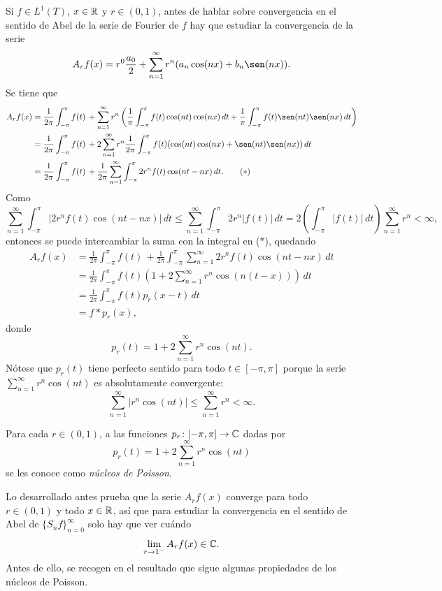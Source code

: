 \documentclass[a4paper, 11pt, oneside]{report}
\begin{document}
Si $f \in L^1(T)$, $x \in \mathbb R$ y $r \in (0,1)$, antes de hablar sobre convergencia en el sentido de Abel de la serie de Fourier de $f$ hay que estudiar la convergencia de la serie
\begin{align*}
  A_rf(x) = r^0\frac{a_0}{2} + \sum_{n=1}^\infty r^n (a_n\cos(nx)+b_n\sen(nx)).
\end{align*}
Se tiene que 
\begin{align*}
  A_rf(x) &= \frac{1}{2\pi}\int_{-\pi}^\pi f(t) \,  + \sum_{n = 1}^\infty r^n\left(\frac{1}{\pi}\int_{-\pi}^\pi f(t)\cos(nt)\cos(nx) \, dt + \frac{1}{\pi}\int_{-\pi}^\pi f(t) \sen(nt)\sen(nx) \, dt\right) \\
  &= \frac{1}{2\pi}\int_{-\pi}^\pi f(t) \,  + 2\sum_{n = 1}^\infty r^n\frac{1}{2\pi}\int_{-\pi}^\pi f(t)(\cos(nt)\cos(nx)  +  \sen(nt)\sen(nx)) \, dt \\
  &= \frac{1}{2\pi}\int_{-\pi}^\pi f(t) \,  + \frac{1}{2\pi}\sum_{n = 1}^\infty \int_{-\pi}^\pi 2r^nf(t)\cos(nt-nx) \, dt. \tag{$\ast$}
\end{align*}
Como
\[\sum_{n=1}^\infty \int_{-\pi}^\pi |2r^n f(t)\cos(nt-nx)| \, dt \leq \sum_{n=1}^\infty \int_{-\pi}^\pi 2r^n|f(t)|  \, dt = 2\left(\int_{-\pi}^\pi |f(t)| \, dt\right) \sum_{n=1}^\infty r^n < \infty,\]
entonces se puede intercambiar la suma con la integral en ($\ast$), quedando
\begin{align*}
  A_rf(x) &= \frac{1}{2\pi}\int_{-\pi}^\pi f(t) \,  + \frac{1}{2\pi} \int_{-\pi}^\pi \sum_{n = 1}^\infty 2r^n f(t)\cos(nt-nx) \, dt \\
  &= \frac{1}{2\pi}\int_{-\pi}^\pi f(t)\left(1+2\sum_{n=1}^\infty r^n \cos(n(t-x))\right) \, dt \\
  &= \frac{1}{2\pi}\int_{-\pi}^\pi f(t)p_r(x-t) \, dt \\
  &= f \ast p_r(x),
\end{align*}
donde
\[p_r(t) = 1+2\sum_{n=1}^\infty r^n \cos(nt).\]
Nótese que $p_r(t)$ tiene perfecto sentido para todo $t \in [-\pi,\pi]$ porque la serie $\sum_{n=1}^\infty r^n \cos(nt)$ es absolutamente convergente:
\[\sum_{n=1}^\infty |r^n \cos(nt)| \leq \sum_{n=1}^\infty r^n < \infty.\]

\begin{definition}
  Para cada $r \in (0,1)$, a las funciones $p_r \colon [-\pi,\pi] \to \mathbb C$ dadas por 
  \[p_r(t) = 1+2\sum_{n=1}^\infty r^n \cos(nt)\]
  se les conoce como \emph{núcleos de Poisson}.
\end{definition}

Lo desarrollado antes prueba que la serie $A_rf(x)$ converge para todo $r \in (0,1)$ y todo $x \in \mathbb R$, así que para estudiar la convergencia en el sentido de Abel de $\{S_nf\}_{n=0}^\infty$ solo hay que ver cuándo
\[\lim_{r\to 1^-} A_rf(x) \in \mathbb C.\]
Antes de ello, se recogen en el resultado que sigue algunas propiedades de los núcleos de Poisson.
\end{document}
